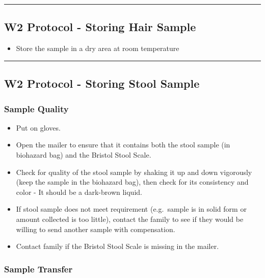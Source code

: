 \documentclass[]{book}
\providecommand{\tightlist}{%
  \setlength{\itemsep}{0pt}\setlength{\parskip}{0pt}}
\begin{document}
\begin{center}\rule{0.5\linewidth}{0.5pt}\end{center}

\hypertarget{w2-protocol---storing-hair-sample}{%
\subsection{W2 Protocol - Storing Hair Sample}\label{w2-protocol---storing-hair-sample}}

\begin{itemize}
\tightlist
\item
  Store the sample in a dry area at room temperature
\end{itemize}

\begin{center}\rule{0.5\linewidth}{0.5pt}\end{center}

\hypertarget{w2-protocol---storing-stool-sample}{%
\subsection{W2 Protocol - Storing Stool Sample}\label{w2-protocol---storing-stool-sample}}

\hypertarget{sample-quality-2}{%
\subsubsection{Sample Quality}\label{sample-quality-2}}

\begin{itemize}
\tightlist
\item
  Put on gloves.
\item
  Open the mailer to ensure that it contains both the stool sample (in biohazard bag) and the Bristol Stool Scale.
\item
  Check for quality of the stool sample by shaking it up and down vigorously (keep the sample in the biohazard bag), then check for its consistency and color - It should be a dark-brown liquid.
\item
  If stool sample does not meet requirement (e.g.~sample is in solid form or amount collected is too little), contact the family to see if they would be willing to send another sample with compensation.
\item
  Contact family if the Bristol Stool Scale is missing in the mailer.
\end{itemize}

\hypertarget{sample-transfer-3}{%
\subsubsection{Sample Transfer}\label{sample-transfer-3}}
\end{document}

